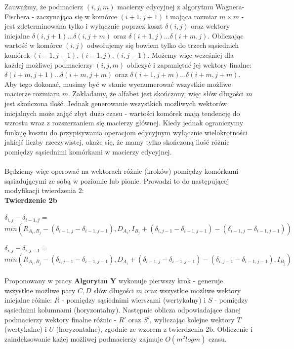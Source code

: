 Zauważmy, że podmacierz $(i,j,m)$ macierzy edycyjnej z algorytmu Wagnera-Fischera - zaczynająca się w komórce $(i+1, j+1)$ i mająca rozmiar $m \times m$ - jest zdeterminowana tylko i wyłącznie poprzez koszt $\delta(i,j)$ oraz wektory inicjalne $\delta(i,j+1)...\delta(i,j+m)$ oraz $\delta(i+1,j)...\delta(i+m,j)$. Obliczając wartość w komórce $(i,j)$ odwołujemy się bowiem tylko do trzech sąsiednich komórek $(i-1,j-1), (i-1,j), (i, j-1)$. Możemy więc wcześniej dla każdej możliwej podmacierzy $(i,j,m)$ obliczyć i zapamiętać jej wektory finalne: $\delta(i+m,j+1)...\delta(i+m,j+m)$ oraz $\delta(i+1,j+m)...\delta(i+m,j+m)$.\\

Aby tego dokonać, musimy być w stanie wyenumerować wszystkie możliwe macierze rozmiaru $m$. Zakładamy, że alfabet jest skończony, więc słów długości $m$ jest skończona ilość. Jednak generowanie wszystkich możliwych wektorów inicjalnych może zająć zbyt dużo czasu - wartości komórek mają tendencję do wzrostu wraz z rozszerzaniem się macierzy głównej. Kiedy jednak ograniczymy funkcję kosztu do przypisywania operacjom edycyjnym wyłącznie wielokrotności jakiejś liczby rzeczywistej, okaże się, że mamy tylko skończoną ilość różnic pomiędzy sąsiednimi komórkami w macierzy edycyjnej.\\\\
Będziemy więc operować na wektorach różnic (kroków) pomiędzy komórkami sąsiadującymi ze sobą w poziomie lub pionie. Prowadzi to do następującej modyfikacji twierdzenia 2:\\

\textbf{Twierdzenie 2b}\\\\
$\delta_{i, j} - \delta_{i-1, j} =$\\
$min(R_{A_i,B_j} - (\delta_{i-1,j} - \delta_{i-1,j-1}), D_{A_i}, I_{B_j} + (\delta_{i,j-1} - \delta_{i-1,j-1}) - (\delta_{i-1,j} - \delta_{i-1,j-1}))$\\\\
$\delta_{i, j} - \delta_{i, j-1} =$\\
$min(R_{A_i,B_j} - (\delta_{i,j-1} - \delta_{i-1,j-1}), D_{A_i} + (\delta_{i-1,j} - \delta_{i-1,j-1}) - (\delta_{i,j-1} - \delta_{i-1,j-1}), I_{B_j})$\\\\

Proponowany w pracy \textbf{Algorytm Y} wykonuje pierwszy krok - generuje wszystkie możliwe pary $C, D$ słów długości $m$ oraz wszystkie możliwe wektory inicjalne różnic:  $R$ - pomiędzy sąsiednimi wierszami (wertykalny) i $S$ - pomiędzy sąsiednimi kolumnami (horyzontalny). Następnie oblicza odpowiadające danej podmacierzy wektory finalne różnic - $R'$ oraz $S'$, wyliczając kolejne wektory $T$ (wertykalne) i $U$ (horyzontalne), zgodnie ze wzorem z twierdzenia 2b. Obliczenie i zaindeksowanie każej możliwej podmacierzy zajmuje $O(m^2log m)$ czasu.\\

